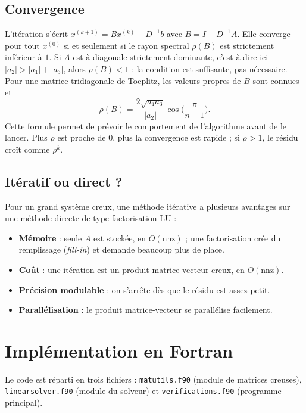\documentclass[a4paper]{scrartcl}
\begin{document}
\subsection{Convergence}

L'itération s'écrit $x^{(k+1)}=Bx^{(k)}+D^{-1}b$ avec $B=I-D^{-1}A$. Elle converge pour tout $x^{(0)}$ 
si et seulement si le rayon spectral $\rho(B)$ est strictement inférieur à $1$. Si $A$ est à diagonale strictement dominante,
 c'est-à-dire ici $|a_2|>|a_1|+|a_3|$, alors $\rho(B)<1$ : la condition est suffisante, pas nécessaire. 
 Pour une matrice tridiagonale de Toeplitz, les valeurs propres de $B$ sont connues et
\begin{equation}
\rho(B)=\frac{2\sqrt{a_1a_3}}{|a_2|}\cos\Big(\frac{\pi}{n+1}\Big).
\label{eq:rho}
\end{equation}
Cette formule permet de prévoir le comportement de l'algorithme avant de le lancer. Plus $\rho$ est proche de $0$,
plus la convergence est rapide ; si $\rho>1$, le résidu croît comme $\rho^k$.

\subsection{Itératif ou direct ?}

Pour un grand système creux, une méthode itérative a plusieurs avantages sur une méthode directe de type factorisation LU :
\begin{itemize}
\item \textbf{Mémoire} : seule $A$ est stockée, en $O(\text{nnz})$ ; une factorisation crée du remplissage (\textit{fill-in}) et demande beaucoup plus de place.
\item \textbf{Coût} : une itération est un produit matrice-vecteur creux, en $O(\text{nnz})$.
\item \textbf{Précision modulable} : on s'arrête dès que le résidu est assez petit.
\item \textbf{Parallélisation} : le produit matrice-vecteur se parallélise facilement.
\end{itemize}

\section{Implémentation en Fortran}

Le code est réparti en trois fichiers : \lstinline{matutils.f90} (module de matrices creuses), \lstinline{linearsolver.f90} (module du solveur) 
et \lstinline{verifications.f90} (programme principal).
\end{document}
